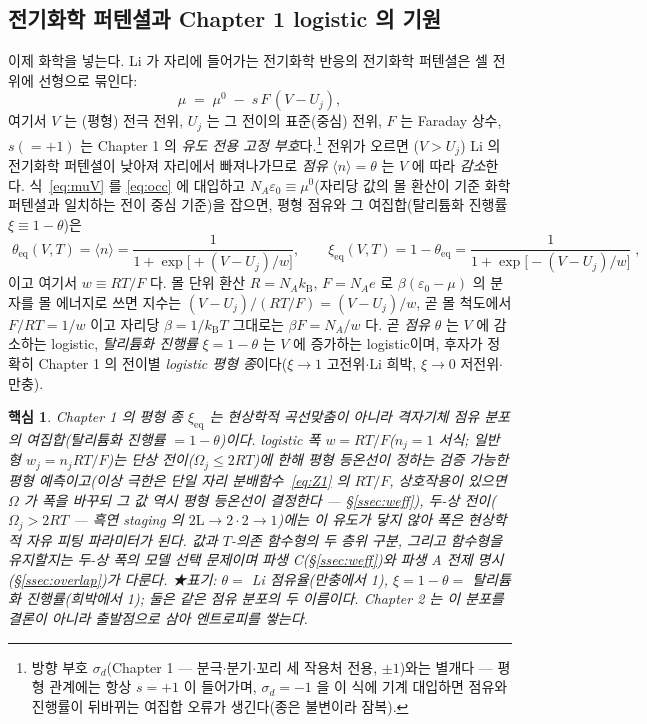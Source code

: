 \documentclass[11pt,a4paper]{article}
\newtheorem*{keybox}{핵심}
\newcommand{\eq}{\mathrm{eq}}
\newcommand{\kB}{k_{\mathrm B}}
\newcommand{\avg}[1]{\langle #1\rangle}
\begin{document}
\subsection{전기화학 퍼텐셜과 Chapter 1 logistic 의 기원}\label{ssec:logistic}
이제 화학을 넣는다. Li 가 자리에 들어가는 전기화학 반응의 전기화학 퍼텐셜은 셀 전위에 선형으로 묶인다:
\begin{equation}
\mu \;=\; \mu^0 \;-\; s\,F\,(V-U_j),
\label{eq:muV}
\end{equation}
여기서 $V$ 는 (평형) 전극 전위, $U_j$ 는 그 전이의 표준(중심) 전위, $F$ 는 Faraday 상수, $s(=+1)$ 는
Chapter 1 의 \emph{유도 전용 고정 부호}다.\footnote{방향 부호 $\sigma_d$(Chapter 1 — 분극$\cdot$분기$\cdot$꼬리
세 작용처 전용, $\pm1$)와는 별개다 — 평형 관계에는 항상 $s{=}+1$ 이 들어가며, $\sigma_d{=}-1$ 을 이 식에
기계 대입하면 점유와 진행률이 뒤바뀌는 여집합 오류가 생긴다(종은 불변이라 잠복).} 전위가 오르면 ($V>U_j$)
Li 의 전기화학 퍼텐셜이 낮아져 자리에서
빠져나가므로 \emph{점유} $\avg{n}=\theta$ 는 $V$ 에 따라 \emph{감소}한다. 식~\eqref{eq:muV} 를
\eqref{eq:occ} 에 대입하고 $N_A\varepsilon_0\equiv\mu^0$(자리당 값의 몰 환산이 기준 화학퍼텐셜과
일치하는 전이 중심 기준)을 잡으면, 평형 점유와 그
여집합(탈리튬화 진행률 $\xi\equiv1-\theta$)은
\begin{equation}
\boxed{\;\theta_\eq(V,T)=\avg{n}=\frac{1}{1+\exp\!\bigl[+(V-U_j)/w\bigr]},\qquad
\xi_\eq(V,T)=1-\theta_\eq=\frac{1}{1+\exp\!\bigl[-(V-U_j)/w\bigr]}\;,}
\label{eq:logistic}
\end{equation}
이고 여기서 $w\equiv RT/F$ 다. 몰 단위 환산 $R=N_A\kB$, $F=N_Ae$ 로 $\beta(\varepsilon_0-\mu)$ 의 분자를
몰 에너지로 쓰면 지수는 $(V-U_j)/(RT/F)=(V-U_j)/w$, 곧 몰 척도에서 $F/RT=1/w$ 이고 자리당
$\beta=1/\kB T$ 그대로는 $\beta F=N_A/w$ 다. 곧 \emph{점유} $\theta$ 는 $V$ 에
감소하는 logistic, \emph{탈리튬화 진행률} $\xi=1-\theta$ 는 $V$ 에 증가하는 logistic이며, 후자가 정확히
Chapter 1 의 전이별 \emph{logistic 평형 종}이다($\xi\to1$ 고전위$\cdot$Li 희박, $\xi\to0$ 저전위$\cdot$만충).

\begin{keybox}
Chapter 1 의 평형 종 $\xi_\eq$ 는 \emph{현상학적 곡선맞춤}이 아니라 \emph{격자기체 점유 분포의 여집합}(탈리튬화
진행률 $=1-\theta$)이다. logistic 폭 $w=RT/F$($n_j{=}1$ 서식; 일반형 $w_j=n_jRT/F$)는 \emph{단상
전이($\Omega_j\le2RT$)에 한해} 평형 등온선이 정하는 검증 가능한 평형 예측이고(이상 극한은 단일 자리
분배함수~\eqref{eq:Z1} 의 $RT/F$, 상호작용이 있으면 $\Omega$ 가 폭을 바꾸되 그 값 역시 평형 등온선이
결정한다 — \S\ref{ssec:weff}),
\emph{두-상 전이}($\Omega_j>2RT$ — 흑연 staging 의 $2\mathrm L\!\to\!2\cdot2\!\to\!1$)에는 이 유도가 닿지
않아 폭은 현상학적 자유 피팅 파라미터가 된다. 값과 $T$-의존 함수형의 두 층위 구분, 그리고 함수형을 유지할지는 두-상 폭의 모델 선택 문제이며 파생
C(\S\ref{ssec:weff})와 파생 A 전제 명시(\S\ref{ssec:overlap})가 다룬다. ★표기: $\theta=$ Li 점유율(만충에서 1), $\xi=1-\theta=$ 탈리튬화 진행률(희박에서 1); 둘은 같은 점유
분포의 두 이름이다. Chapter 2 는 이 분포를 결론이 아니라 출발점으로 삼아 엔트로피를 쌓는다.
\end{keybox}
\end{document}
